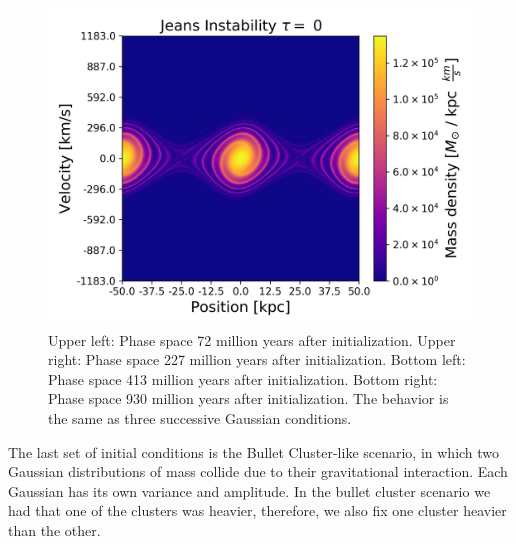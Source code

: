 \begin{figure}[h!]
    \includegraphics[scale=0.45]{imag/jeans90.png}
    \caption{Upper left: Phase space 72 million years after initialization. Upper right: Phase space 227 million years after initialization. Bottom left: Phase space 413 million years after initialization. Bottom right: Phase space 930 million years after initialization. The behavior is the same as three successive Gaussian conditions.}
    \label{1dJeans}
\end{figure}

The last set of initial conditions is the Bullet Cluster-like scenario, in which two Gaussian distributions of mass collide due to their gravitational interaction.
Each Gaussian has its own variance and amplitude. In the bullet cluster scenario we had that one of the clusters was heavier, therefore, we also fix one cluster heavier than the other.

